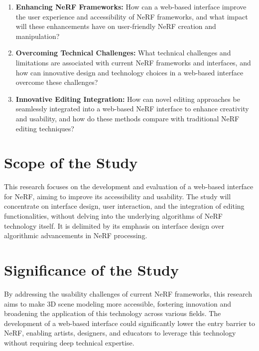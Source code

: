 \begin{enumerate}
    \item \textbf{Enhancing NeRF Frameworks:} How can a web-based interface improve the user experience and accessibility of NeRF frameworks, and what impact will these enhancements have on user-friendly NeRF creation and manipulation?

    \item \textbf{Overcoming Technical Challenges:} What technical challenges and limitations are associated with current NeRF frameworks and interfaces, and how can innovative design and technology choices in a web-based interface overcome these challenges?

    \item \textbf{Innovative Editing Integration:} How can novel editing approaches be seamlessly integrated into a web-based NeRF interface to enhance creativity and usability, and how do these methods compare with traditional NeRF editing techniques?
\end{enumerate}

\section*{Scope of the Study}
\label{sec:intro:scope}
This research focuses on the development and evaluation of a web-based interface for NeRF, aiming to improve its accessibility and usability. 
The study will concentrate on interface design, user interaction, and the integration of editing functionalities, without delving into the underlying algorithms of NeRF technology itself. 
It is delimited by its emphasis on interface design over algorithmic advancements in NeRF processing.

\section*{Significance of the Study}
\label{sec:intro:significance}
By addressing the usability challenges of current NeRF frameworks, this research aims to make 3D scene modeling more accessible, fostering innovation and broadening the application of this technology across various fields. 
The development of a web-based interface could significantly lower the entry barrier to NeRF, enabling artists, designers, and educators to leverage this technology without requiring deep technical expertise.



